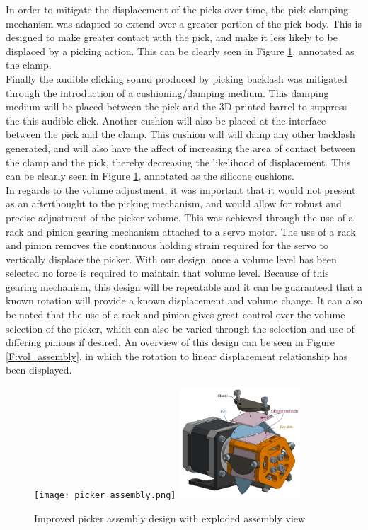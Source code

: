 \documentclass[a4paper,11pt]{article}
\begin{document}
In order to mitigate the displacement of the picks over time, the pick clamping mechanism was adapted to extend over a greater portion of the pick body. This is designed to make greater contact with the pick, and make it less likely to be displaced by a picking action. This can be clearly seen in Figure \ref{F:pic_assembly}, annotated as the clamp.\\

Finally the audible clicking sound produced by picking backlash was mitigated through the introduction of a cushioning/damping medium. This damping medium will be placed between the pick and the 3D printed barrel to suppress the this audible click. Another cushion will also be placed at the interface between the pick and the clamp. This cushion will will damp any other backlash generated, and will also have the affect of increasing the area of contact between the clamp and the pick, thereby decreasing the likelihood of displacement. This can be clearly seen in Figure \ref{F:pic_assembly}, annotated as the silicone cushions.\\

In regards to the volume adjustment, it was important that it would not present as an afterthought to the picking mechanism, and would allow for robust and precise adjustment of the picker volume. This was achieved through the use of a rack and pinion gearing mechanism attached to a servo motor. The use of a rack and pinion removes the continuous holding strain required for the servo to vertically displace the picker. With our design, once a volume level has been selected no force is required to maintain that volume level. Because of this gearing mechanism, this design will be repeatable and it can be guaranteed that a known rotation will provide a known displacement and volume change. It can also be noted that the use of a rack and pinion gives great control over the volume selection of the picker, which can also be varied through the selection and use of differing pinions if desired. An overview of this design can be seen in Figure \ref{F:vol_assembly}, in which the rotation to linear displacement relationship has been displayed. 

\begin{figure}[h!]
  \begin{center}
    \texttt{[image: picker\_assembly.png]}
    \includegraphics[width=0.4\textwidth]{picker_explode.png}
    \label{F:pic_assembly}
    \caption{Improved picker assembly design with exploded assembly view}
  \end{center}
\end{figure}
\end{document}
